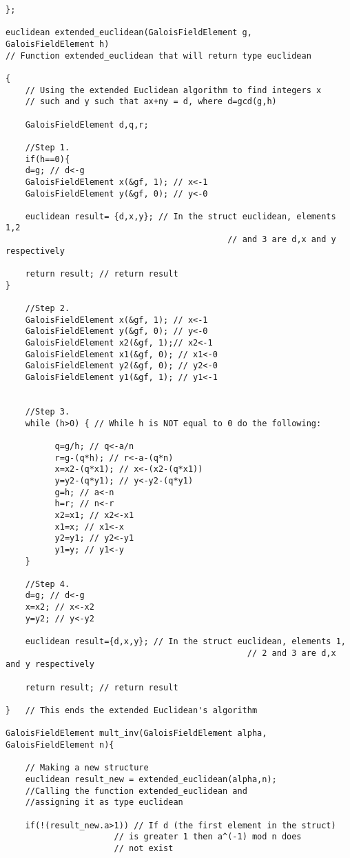 \documentclass[iwp,first]{luthesis}
\begin{document}
\begin{verbatim}
};

euclidean extended_euclidean(GaloisFieldElement g, 
GaloisFieldElement h) 
// Function extended_euclidean that will return type euclidean

{
    // Using the extended Euclidean algorithm to find integers x 
    // such and y such that ax+ny = d, where d=gcd(g,h)

    GaloisFieldElement d,q,r;
    
    //Step 1.  
    if(h==0){ 
    d=g; // d<-g
    GaloisFieldElement x(&gf, 1); // x<-1
    GaloisFieldElement y(&gf, 0); // y<-0

	euclidean result= {d,x,y}; // In the struct euclidean, elements 1,2 
      			      			             // and 3 are d,x and y respectively
    
    return result; // return result
}
    
    //Step 2.
	GaloisFieldElement x(&gf, 1); // x<-1
    GaloisFieldElement y(&gf, 0); // y<-0
    GaloisFieldElement x2(&gf, 1);// x2<-1
    GaloisFieldElement x1(&gf, 0); // x1<-0
    GaloisFieldElement y2(&gf, 0); // y2<-0
    GaloisFieldElement y1(&gf, 1); // y1<-1
   
    
    //Step 3.
    while (h>0) { // While h is NOT equal to 0 do the following:
          
          q=g/h; // q<-a/n
          r=g-(q*h); // r<-a-(q*n)
          x=x2-(q*x1); // x<-(x2-(q*x1))
          y=y2-(q*y1); // y<-y2-(q*y1)
          g=h; // a<-n
          h=r; // n<-r
          x2=x1; // x2<-x1
          x1=x; // x1<-x
          y2=y1; // y2<-y1
          y1=y; // y1<-y
    }
    
    //Step 4.
    d=g; // d<-g
    x=x2; // x<-x2
    y=y2; // y<-y2
    
    euclidean result={d,x,y}; // In the struct euclidean, elements 1,
					                             // 2 and 3 are d,x and y respectively
    
    return result; // return result
    
}   // This ends the extended Euclidean's algorithm

GaloisFieldElement mult_inv(GaloisFieldElement alpha, 
GaloisFieldElement n){
        
    // Making a new structure
    euclidean result_new = extended_euclidean(alpha,n); 
    //Calling the function extended_euclidean and 
    //assigning it as type euclidean
	
	if(!(result_new.a>1)) // If d (the first element in the struct)
                      // is greater 1 then a^(-1) mod n does
                      // not exist 


\end{verbatim}
\end{document}
